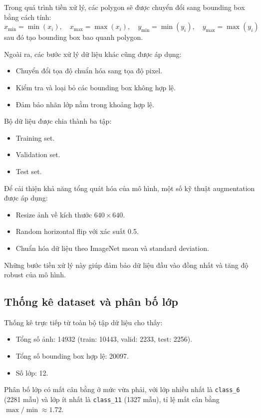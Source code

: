 \documentclass[12pt,a4paper]{article}
\begin{document}
Trong quá trình tiền xử lý, các polygon sẽ được chuyển đổi sang bounding box bằng cách tính:
\[
x_{\min}=\min(x_i),\quad x_{\max}=\max(x_i),\quad y_{\min}=\min(y_i),\quad y_{\max}=\max(y_i)
\]
sau đó tạo bounding box bao quanh polygon.

Ngoài ra, các bước xử lý dữ liệu khác cũng được áp dụng:
\begin{itemize}
    \item Chuyển đổi tọa độ chuẩn hóa sang tọa độ pixel.
    \item Kiểm tra và loại bỏ các bounding box không hợp lệ.
    \item Đảm bảo nhãn lớp nằm trong khoảng hợp lệ.
\end{itemize}

Bộ dữ liệu được chia thành ba tập:
\begin{itemize}
    \item Training set.
    \item Validation set.
    \item Test set.
\end{itemize}

Để cải thiện khả năng tổng quát hóa của mô hình, một số kỹ thuật augmentation được áp dụng:
\begin{itemize}
    \item Resize ảnh về kích thước $640\times640$.
    \item Random horizontal flip với xác suất 0.5.
    \item Chuẩn hóa dữ liệu theo ImageNet mean và standard deviation.
\end{itemize}

Những bước tiền xử lý này giúp đảm bảo dữ liệu đầu vào đồng nhất và tăng độ robust của mô hình.

\subsection{Thống kê dataset và phân bố lớp}

Thống kê trực tiếp từ toàn bộ tập dữ liệu cho thấy:
\begin{itemize}
    \item Tổng số ảnh: 14932 (train: 10443, valid: 2233, test: 2256).
    \item Tổng số bounding box hợp lệ: 20097.
    \item Số lớp: 12.
\end{itemize}

Phân bố lớp có mất cân bằng ở mức vừa phải, với lớp nhiều nhất là \texttt{class\_6} (2281 mẫu) và lớp ít nhất là \texttt{class\_11} (1327 mẫu), tỉ lệ mất cân bằng $\max/\min \approx 1.72$.
\end{document}
